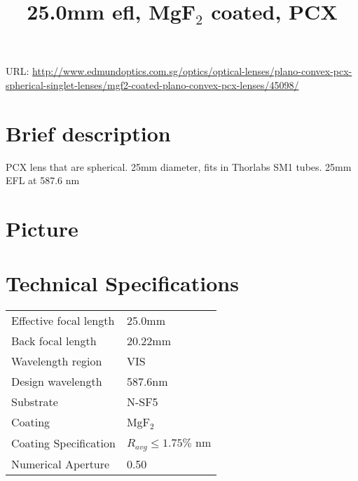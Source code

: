 \documentclass{article}
\title{\vspace{-4cm}25.0mm efl, MgF$_2$ coated, PCX}
\date{}
\begin{document}
\maketitle

\vspace{-1cm}

URL: \url{http://www.edmundoptics.com.sg/optics/optical-lenses/plano-convex-pcx-spherical-singlet-lenses/mgf2-coated-plano-convex-pcx-lenses/45098/}

\begin{multicols}{2}

\section{Brief description}

PCX lens that are spherical. 25mm diameter, fits in Thorlabs SM1 tubes. 25mm EFL at 587.6 nm


\section{Picture}

\section{Technical Specifications}


\begin{tabular}{|l|l|}
  Effective focal length & 25.0mm \\
  Back focal length & 20.22mm\\
  Wavelength region & VIS \\
  Design wavelength & 587.6nm \\
  Substrate & N-SF5 \\
  Coating & MgF$_{2}$ \\
  Coating Specification & $R_{avg} \leq 1.75\%$ nm \\
  Numerical Aperture & 0.50 \\
\end{tabular}%


\end{multicols}
\end{document}
